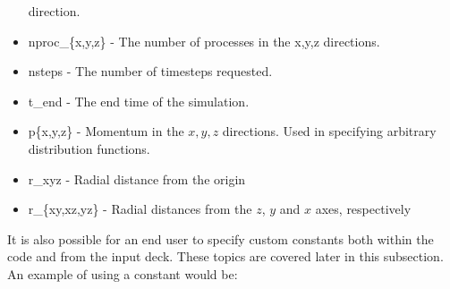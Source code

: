 \begin{itemize}
  direction.
\item nproc\_\{x,y,z\} - The number of processes in the x,y,z directions.
\item nsteps - The number of timesteps requested.
\item t\_end - The end time of the simulation.
\item p\{x,y,z\} - Momentum in the $x, y, z$ directions. Used in specifying
  arbitrary distribution functions.
\item r\_xyz - Radial distance from the origin
\item r\_\{xy,xz,yz\} - Radial distances from the $z$, $y$ and $x$ axes,
  respectively
\end{itemize}

It is also possible for an end user to specify custom constants both within
the code and from the input deck. These topics are covered later in this
subsection. An example of using a constant would be:\\
\indent{}

